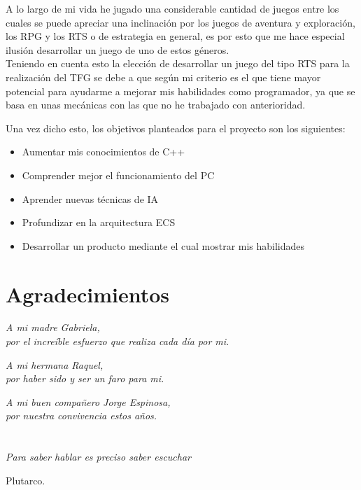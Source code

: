 A lo largo de mi vida he jugado una considerable cantidad de juegos entre los cuales
se puede apreciar una inclinación por los juegos de aventura y exploración, los 
\ac{RPG} y los \ac{RTS} o de estrategia en general, es por esto que me hace especial
ilusión desarrollar un juego de uno de estos géneros.\\
Teniendo en cuenta esto la elección de desarrollar un juego del tipo \ac{RTS} para la
realización del \ac{TFG} se debe a que según mi criterio es el que tiene mayor
potencial para ayudarme a mejorar mis habilidades como programador, ya que se basa en
unas mecánicas con las que no he trabajado con anterioridad.

Una vez dicho esto, los objetivos planteados para el proyecto son los siguientes:
\begin{itemize}
	\item Aumentar mis conocimientos de C++
	\item Comprender mejor el funcionamiento del \ac{PC}
	\item Aprender nuevas técnicas de \ac{IA}
	\item Profundizar en la arquitectura \ac{ECS}
	\item Desarrollar un producto mediante el cual mostrar mis habilidades
\end{itemize}

\cleardoublepage %
\chapter*{Agradecimientos}
\setlength{\leftmargin}{0.5\textwidth}
\setlength{\parsep}{0cm}
\addtolength{\topsep}{0.5cm}
\begin{flushright}
\small\em{
A mi madre Gabriela,\\
por el increíble esfuerzo que realiza cada día por mi. 
}
\end{flushright}
\begin{flushright}
\small\em{
A mi hermana Raquel,\\
por haber sido y ser un faro para mi. 
}
\end{flushright}
\begin{flushright}
\small\em{
A mi buen compañero Jorge Espinosa,\\
por nuestra convivencia estos años. 
}
\end{flushright}

\cleardoublepage %
\chapter*{}
\setlength{\leftmargin}{0.5\textwidth}
\setlength{\parsep}{0cm}
\addtolength{\topsep}{0.5cm}
\begin{flushright}
\small\em{
Para saber hablar es preciso saber escuchar\\
}
\end{flushright}
\begin{flushright}
\small{
Plutarco.
}
\end{flushright}
\cleardoublepage %
